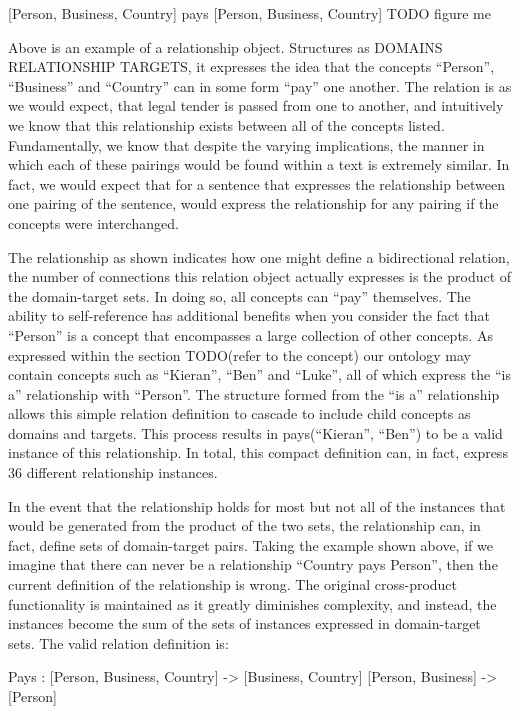 \documentclass[11pt]{article} %
\begin{document}
[Person, Business, Country] pays [Person, Business, Country] TODO figure me

Above is an example of a relationship object. Structures as DOMAINS RELATIONSHIP TARGETS, it expresses the idea that the concepts “Person”, “Business” and “Country” can in some form “pay” one another. The relation is as we would expect, that legal tender is passed from one to another, and intuitively we know that this relationship exists between all of the concepts listed. Fundamentally, we know that despite the varying implications, the manner in which each of these pairings would be found within a text is extremely similar. In fact, we would expect that for a sentence that expresses the relationship between one pairing of the sentence, would express the relationship for any pairing if the concepts were interchanged.

The relationship as shown indicates how one might define a bidirectional relation, the number of connections this relation object actually expresses is the product of the domain-target sets. In doing so, all concepts can “pay” themselves. The ability to self-reference has additional benefits when you consider the fact that “Person” is a concept that encompasses a large collection of other concepts. As expressed within the section TODO(refer to the concept) our ontology may contain concepts such as “Kieran”, “Ben” and “Luke”, all of which express the “is a” relationship with “Person”. The structure formed from the “is a” relationship allows this simple relation definition to cascade to include child concepts as domains and targets. This process results in pays(“Kieran”, “Ben”) to be a valid instance of this relationship. In total, this compact definition can, in fact, express 36 different relationship instances.

In the event that the relationship holds for most but not all of the instances that would be generated from the product of the two sets, the relationship can, in fact, define sets of domain-target pairs. Taking the example shown above, if we imagine that there can never be a relationship “Country pays Person”, then the current definition of the relationship is wrong. The original cross-product functionality is maintained as it greatly diminishes complexity, and instead, the instances become the sum of the sets of instances expressed in domain-target sets. The valid relation definition is:

Pays :
[Person, Business, Country] -> [Business, Country]
[Person, Business] -> [Person]
\end{document}
